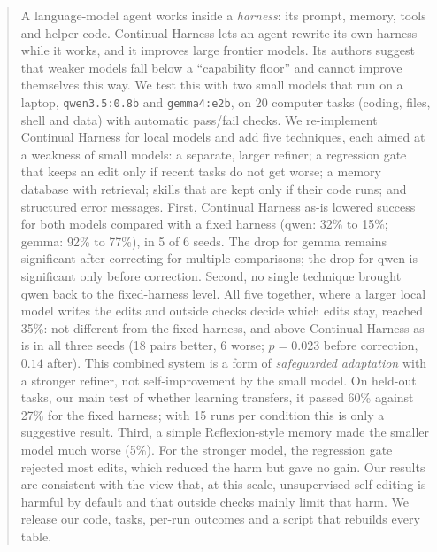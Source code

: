 \begin{abstract}
A language-model agent works inside a \emph{harness}: its prompt, memory, tools and helper code.
Continual Harness lets an agent rewrite its own harness while it works, and it improves large
frontier models. Its authors suggest that weaker models fall below a ``capability floor'' and cannot
improve themselves this way. We test this with two small models that run on a laptop,
\texttt{qwen3.5:0.8b} and \texttt{gemma4:e2b}, on 20 computer tasks (coding, files, shell and data)
with automatic pass/fail checks. We re-implement Continual Harness for local models and add five
techniques, each aimed at a weakness of small models: a separate, larger refiner; a regression gate
that keeps an edit only if recent tasks do not get worse; a memory database with retrieval; skills
that are kept only if their code runs; and structured error messages. First, Continual Harness as-is
lowered success for both models compared with a fixed harness (qwen: 32\% to 15\%; gemma: 92\% to
77\%), in 5 of 6 seeds. The drop for gemma remains significant after correcting for multiple
comparisons; the drop for qwen is significant only before correction. Second, no single technique
brought qwen back to the fixed-harness level. All five together, where a larger local model writes
the edits and outside checks decide which edits stay, reached 35\%: not different from the fixed
harness, and above Continual Harness as-is in all three seeds (18 pairs better, 6 worse; $p = 0.023$
before correction, $0.14$ after). This combined system is a form of \emph{safeguarded adaptation}
with a stronger refiner, not self-improvement by the small model. On held-out tasks, our main test of
whether learning transfers, it passed 60\% against 27\% for the fixed harness; with 15 runs per
condition this is only a suggestive result. Third, a simple Reflexion-style memory made the smaller
model much worse (5\%). For the stronger model, the regression gate rejected most edits, which
reduced the harm but gave no gain. Our results are consistent with the view that, at this scale,
unsupervised self-editing is harmful by default and that outside checks mainly limit that harm. We
release our code, tasks, per-run outcomes and a script that rebuilds every table.
\end{abstract}
